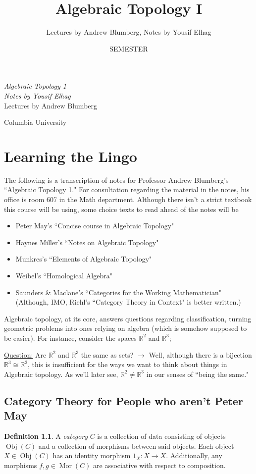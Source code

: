 \documentclass[leqno, openany]{memoir}
\title{Algebraic Topology I}
\author{Lectures by Andrew Blumberg, Notes by Yousif Elhag}
\date{SEMESTER}
\theoremstyle{definition}
\newtheorem{defn}[thm]{Definition}
\theoremstyle{remark}
\theoremstyle{plain}
\theoremstyle{definition}
\theoremstyle{remark}
\newcommand{\R}{\mathbb{R}}
\newcommand{\iso}{\cong}
\DeclareMathOperator{\Obj}{Obj}
\DeclareMathOperator{\Mor}{Mor}
\newcommand*{\titleSW}
    {\begingroup%
    \raggedleft
    \vspace*{\baselineskip}
    {\Huge\itshape Algebraic Topology 1}\\[\baselineskip]
    {\large\itshape Notes by Yousif Elhag}\\[0.2\textheight]
    {\Large Lectures by Andrew Blumberg}\par
    \vfill
    {\Large \sffamily Columbia University}
    \vspace*{\baselineskip}
\endgroup}
\begin{document}
    
\begin{titlingpage}
\titleSW
\end{titlingpage}

\thispagestyle{empty}



\tableofcontents

\chapter{Learning the Lingo}%
The following is a transcription of notes for Professor Andrew Blumberg's ``Algebraic Topology 1." For consultation regarding the material in the notes, his office is room 607 in the Math department. Although there isn't a strict textbook this course will be using, some choice texts to read ahead of the notes will be 
\begin{itemize}
    \item Peter May's ``Concise course in Algebraic Topology"
    \item Haynes Miller's ``Notes on Algebraic Topology"
    \item Munkres's ``Elements of Algebraic Topology"
    \item Weibel's ``Homological Algebra"
    \item Saunders \& Maclane's ``Categories for the Working Mathematician" (Although, IMO, Riehl's ``Category Theory in Context" is better written.)
\end{itemize}
Algebraic topology, at its core, answers questions regarding classification, turning geometric problems into ones relying on algebra (which is somehow supposed to be easier). For instance, consider the spaces $\R^2$ and $\R^3$; 
\par \underline{Question:} Are $\R^2$ and $\R^3$ the same as sets? $\rightarrow$ Well, although there is a bijection $\R^3 \iso \R^2$, this is insufficient for the ways we want to think about things in Algebraic topology. As we'll later see, $\R^2 \neq \R^3$ in our senses of ``being the same."
\section{Category Theory for People who aren't Peter May}%
\begin{defn}
    A \emph{category} $C$ is a collection of data consisting of objects $\Obj(C)$ and a collection of morphisms between said-objects. Each object $X \in \Obj(C)$ has an identity morphism $1_X: X \to X$. Additionally, any morphisms $f,g \in \Mor(C)$ are associative with respect to composition.
\end{defn}
\end{document}

